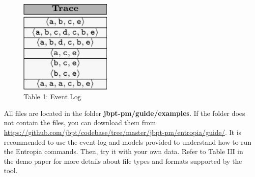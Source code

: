 \begin{figure}[h!]
\begin{center}
\vspace{5mm}
\begin{minipage}{0.45\textwidth}
 \centering
\includegraphics[width=0.40\textwidth]{fig/eventLog.pdf} 
\caption*{ Table 1: Event Log}
\label{fig:Log}
\end{minipage}
\end{center}
\vspace{-4mm}
\end{figure}

All files are located in the folder \textbf{jbpt-pm\slash guide\slash examples}. If the folder does not contain the files, you can download them from \url{https://github.com/jbpt/codebase/tree/master/jbpt-pm/entropia/guide/}. It is recommended to use the event log and models provided to understand how to run the Entropia commands. Then, try it with your own data. Refer to Table III in the demo paper for more details about file types and formats supported by the tool.